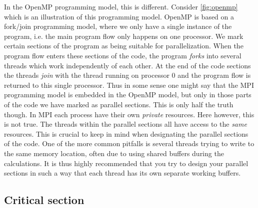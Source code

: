 In the OpenMP programming model, this is different. Consider
\autoref{fig:openmp} which is an illustration of this programming model. OpenMP
is based on a fork/join programming model, where we only have a single instance
of the program, i.e. the main program flow only happens on one processor. We
mark certain sections of the program as being suitable for parallelization. When
the program flow enters these sections of the code, the program \emph{forks}
into several threads which work independently of each other. At the end of the
code sections the threads \emph{join} with the thread running on processor 0 and
the program flow is returned to this single processor. Thus in some sense one
might say that the MPI programming model is embedded in the OpenMP model, but
only in those parts of the code we have marked as parallel sections. This is
only half the truth though. In MPI each process have their own \emph{private}
resources. Here however, this is not true. The threads within the parallel
sections all have access to the \emph{same} resources. This is crucial to keep
in mind when designating the parallel sections of the code. One of the more
common pitfalls is several threads trying to write to the same memory location,
often due to using shared buffers during the calculations. It is thus highly
recommended that you try to design your parallel sections in such a way that
each thread has its own separate working buffers.

\subsection{Critical section}
\label{sec:critsec}

